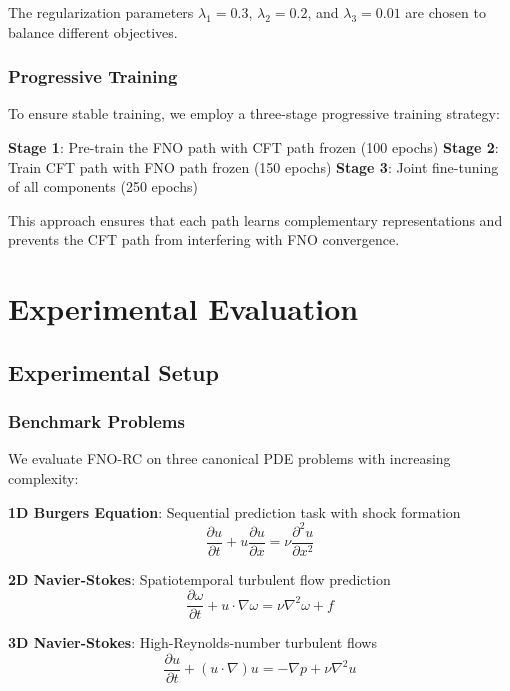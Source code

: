 \documentclass[11pt]{article}
\begin{document}
The regularization parameters $\lambda_1 = 0.3$, $\lambda_2 = 0.2$, and $\lambda_3 = 0.01$ are chosen to balance different objectives.

\subsubsection{Progressive Training}

To ensure stable training, we employ a three-stage progressive training strategy:

\textbf{Stage 1}: Pre-train the FNO path with CFT path frozen (100 epochs)
\textbf{Stage 2}: Train CFT path with FNO path frozen (150 epochs)  
\textbf{Stage 3}: Joint fine-tuning of all components (250 epochs)

This approach ensures that each path learns complementary representations and prevents the CFT path from interfering with FNO convergence.

\section{Experimental Evaluation}

\subsection{Experimental Setup}

\subsubsection{Benchmark Problems}

We evaluate FNO-RC on three canonical PDE problems with increasing complexity:

\textbf{1D Burgers Equation}: Sequential prediction task with shock formation
\begin{equation}
\frac{\partial u}{\partial t} + u \frac{\partial u}{\partial x} = \nu \frac{\partial^2 u}{\partial x^2}
\end{equation}

\textbf{2D Navier-Stokes}: Spatiotemporal turbulent flow prediction
\begin{equation}
\frac{\partial \omega}{\partial t} + u \cdot \nabla \omega = \nu \nabla^2 \omega + f
\end{equation}

\textbf{3D Navier-Stokes}: High-Reynolds-number turbulent flows
\begin{equation}
\frac{\partial u}{\partial t} + (u \cdot \nabla)u = -\nabla p + \nu \nabla^2 u
\end{equation}
\end{document}
